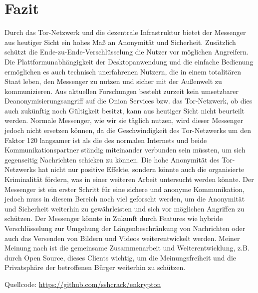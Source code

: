 \documentclass[a4paper,ngerman, headheight=28pt,12pt]{scrartcl}
\begin{document}
\section{Fazit}
Durch das Tor-Netzwerk und die dezentrale Infrastruktur bietet der Messenger aus heutiger Sicht ein hohes Maß an Anonymität und Sicherheit. Zusätzlich schützt die Ende-zu-Ende-Verschlüsselung die Nutzer vor möglichen Angreifern. Die Plattformunabhängigkeit der Desktopanwendung und die einfache Bedienung ermöglichen es auch technisch unerfahrenen Nutzern, die in einem totalitären Staat leben, den Messenger zu nutzen und sicher mit der Außenwelt zu kommunizieren. Aus aktuellen Forschungen besteht zurzeit kein umsetzbarer Deanonymisierungsangriff auf die Onion Services bzw. das Tor-Netzwerk, ob dies auch zukünftig noch Gültigkeit besitzt, kann aus heutiger Sicht nicht beurteilt werden.
Normale Messenger, wie wir sie täglich nutzen, wird dieser Messenger jedoch nicht ersetzen können, da die Geschwindigkeit des Tor-Netzwerks um den Faktor 120 langsamer ist als die des normalen Internets und beide Kommunikationspartner ständig miteinander verbunden sein müssten, um sich gegenseitig Nachrichten schicken zu können. Die hohe Anonymität des Tor-Netzwerks hat nicht nur positive Effekte, sondern könnte auch die organisierte Kriminalität fördern, was in einer weiteren Arbeit untersucht werden könnte. Der Messenger ist ein erster Schritt für eine sichere und anonyme Kommunikation, jedoch muss in diesem Bereich noch viel geforscht werden, um die Anonymität und Sicherheit weiterhin zu gewährleisten und sich vor möglichen Angriffen zu schützen. Der Messenger könnte in Zukunft durch Features wie hybride Verschlüsselung zur Umgehung der Längenbeschränkung von Nachrichten oder auch das Versenden von Bildern und Videos weiterentwickelt werden. Meiner Meinung nach ist die gemeinsame Zusammenarbeit und Weiterentwicklung, z.B. durch Open Source, dieses Clients wichtig, um die Meinungsfreiheit und die Privatsphäre der betroffenen Bürger weiterhin zu schützen.
\newpage
\nolinenumbers{}
\printbibliography[notkeyword={figure}]
\label{LastPageDoc}

\newpage
{}%
\appendix
\printbibliography[heading=subbibliography,title={Anhang},keyword={figure}]
Quellcode: \href{https://github.com/sshcrack/enkrypton}{https://github.com/sshcrack/enkrypton}

\end{document}
